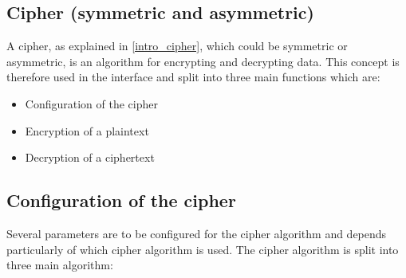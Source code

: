 \subsection{Cipher (symmetric and asymmetric)}
\label{gci_ciph}
A cipher, as explained in \ref{intro_cipher}, which
could be symmetric or asymmetric, is an algorithm for encrypting and decrypting
data.\newline
This concept is therefore used in the interface and split into three main
functions which are:
\begin{itemize}
  \item Configuration of the cipher
  \item Encryption of a plaintext
  \item Decryption of a ciphertext
\end{itemize}
\subsection*{Configuration of the cipher}
Several parameters are to be configured for the cipher algorithm and depends
particularly of which cipher algorithm is used.\newline
The cipher algorithm is split into three main algorithm:
